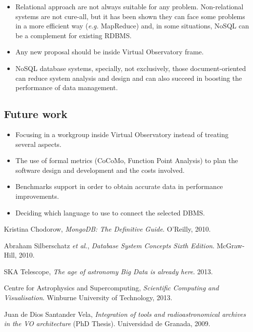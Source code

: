 \documentclass[a4paper,12pt]{article}
\begin{document}
\begin{itemize}

\item Relational approach are not always suitable for any problem. Non-relational systems are not cure-all, but it has been shown they can face some problems in a more efficient way (\textit{e.g.} MapReduce) and, in some situations, NoSQL can be a complement for existing RDBMS.

\item Any new proposal should be inside Virtual Observatory frame.

\item NoSQL database systems, specially, not exclusively, those document-oriented can reduce system analysis and design and can also succeed in boosting the performance of data management.

\end{itemize}

\subsection{Future work}

\begin{itemize}

\item Focusing in a workgroup inside Virtual Observatory instead of treating several aspects.

\item The use of formal metrics (CoCoMo, Function Point Analysis) to plan the software design and development and the costs involved.

\item Benchmarks support in order to obtain accurate data in performance improvements.

\item Deciding which language to use to connect the selected DBMS.

\end{itemize}




\begin{thebibliography}{9}

  Kristina Chodorow,
  \emph{MongoDB: The Definitive Guide}.
  O'Reilly,
  2010.

  Abraham Silberschatz \textit{et al.},
  \emph{Database System Concepts Sixth Edition}.
  McGraw-Hill,
  2010.


  SKA Telescope,
  \emph{The age of astronomy Big Data is already here}.
  2013.

  Centre for Astrophysics and Supercomputing,
  \emph{Scientific Computing and Visualisation}.
  Winburne University of Technology,
  2013.

  Juan de Dios Santander Vela,
  \emph{Integration of tools and radioastronomical archives in the VO architecture} (PhD Thesis).
  Universidad de Granada,
  2009.


\end{thebibliography}
\end{document}
